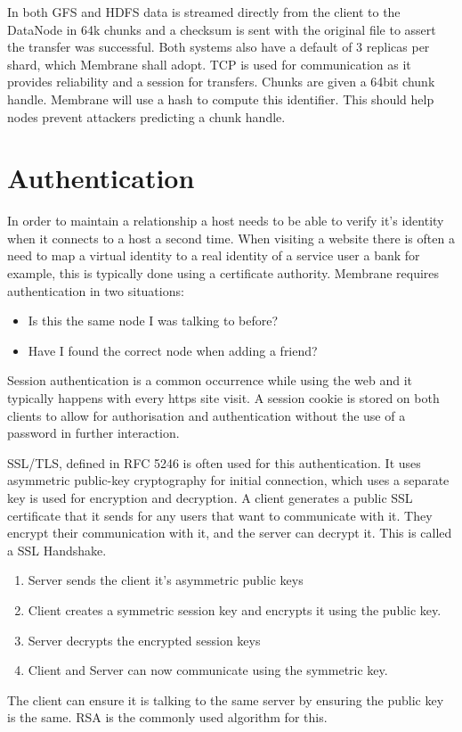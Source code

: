 \documentclass[11pt, a4paper, twocolumn, twoside]{report}
\begin{document}
In both GFS and HDFS data is streamed directly from the client to the DataNode in 64k chunks and a checksum is sent with the original file to assert the transfer was successful. Both systems also have a default of 3 replicas per shard, which Membrane shall adopt. TCP is used for communication as it provides reliability and a session for transfers. Chunks are given a 64bit chunk handle. Membrane will use a hash to compute this identifier. This should help nodes prevent attackers predicting a chunk handle.

\section{Authentication}

In order to maintain a relationship a host needs to be able to verify it's identity when it connects to a host a second time. When visiting a website there is often a need to map a virtual identity to a real identity of a service user \citep{hericourt2001method} a bank for example, this is typically done using a certificate authority. Membrane requires authentication in two situations:
\begin{itemize}
 \item Is this the same node I was talking to before?
 \item Have I found the correct node when adding a friend?
\end{itemize}
Session authentication is a common occurrence while using the web and it typically happens with every https site visit. A session cookie is stored on both clients to allow for authorisation and authentication without the use of a password in further interaction. \citep{mayo2008security}

SSL/TLS, defined in RFC 5246 \citep{dierks2008transport} is often used for this authentication. It uses asymmetric public-key cryptography for initial connection, which uses a separate key is used for encryption and decryption. A client generates a public SSL certificate that it sends for any users that want to communicate with it. They encrypt their communication with it, and the server can decrypt it. This is called a SSL Handshake.
\begin{enumerate}
 \item Server sends the client it's asymmetric public keys
 \item Client creates a symmetric session key and encrypts it using the public key.
 \item Server decrypts the encrypted session keys
 \item Client and Server can now communicate using the symmetric key.
\end{enumerate}
The client can ensure it is talking to the same server by ensuring the public key is the same. RSA is the commonly used algorithm for this.
\end{document}
